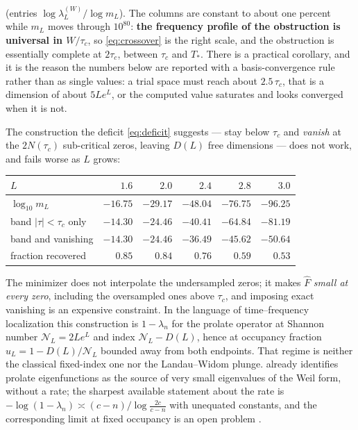 \noindent
(entries $\log\lambda^{(W)}_L/\log m_L$). The columns are constant to about one
percent while $m_L$ moves through $10^{80}$: \textbf{the frequency profile of the
obstruction is universal in $W/\tau_c$}, so \eqref{eq:crossover} is the right
scale, and the obstruction is essentially complete at $2\tau_c$, between $\tau_c$
and $T_*$. There is a practical corollary, and it is the reason the numbers below
are reported with a basis-convergence rule rather than as single values: a trial
space must reach about $2.5\,\tau_c$, that is a dimension of about $5Le^L$, or the
computed value saturates and looks converged when it is not.

The construction the deficit \eqref{eq:deficit} suggests --- stay below $\tau_c$
and \emph{vanish} at the $2N(\tau_c)$ sub-critical zeros, leaving $D(L)$ free
dimensions --- does not work, and fails worse as $L$ grows:

\begin{center}
\begin{tabular}{@{}lrrrrr@{}}
\toprule
$L$ & $1.6$ & $2.0$ & $2.4$ & $2.8$ & $3.0$\\
\midrule
$\log_{10}m_L$ & $-16.75$ & $-29.17$ & $-48.04$ & $-76.75$ & $-96.25$\\
band $|\tau|<\tau_c$ only & $-14.30$ & $-24.46$ & $-40.41$ & $-64.84$ & $-81.19$\\
band and vanishing & $-14.30$ & $-24.46$ & $-36.49$ & $-45.62$ & $-50.64$\\
\midrule
fraction recovered & $0.85$ & $0.84$ & $0.76$ & $0.59$ & $0.53$\\
\bottomrule
\end{tabular}
\end{center}

The minimizer does not interpolate the undersampled zeros; it makes $\widehat F$
\emph{small at every zero}, including the oversampled ones above $\tau_c$, and
imposing exact vanishing is an expensive constraint. In the language of
time--frequency localization this construction is $1-\lambda_n$ for the prolate
operator at Shannon number $\mathcal N_L=2Le^L$ and index $\mathcal N_L-D(L)$,
hence at occupancy fraction $u_L=1-D(L)/\mathcal N_L$ bounded away from both
endpoints. That regime is neither the classical fixed-index one nor the
Landau--Widom plunge. \cite{ConnesConsaniProlate} already identifies prolate
eigenfunctions as the source of very small eigenvalues of the Weil form, without
a rate; the sharpest available statement about the rate is
$-\log(1-\lambda_n)\asymp(c-n)/\log\frac{2c}{c-n}$ with unequated constants, and
the corresponding limit at fixed occupancy is an open problem
\cite{Kulikov}.

